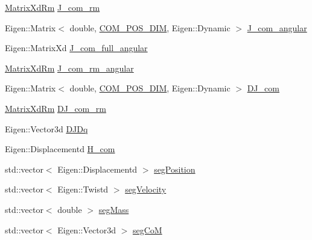 \begin{DoxyCompactItemize}
\item 
\hyperlink{namespaceocra__icub_aa5e36a19ed031c28ca83c207bd7dd83f}{Matrix\+Xd\+Rm} \hyperlink{structOcraWbiModel_1_1OcraWbiModel__pimpl_a58b26a33ee0449f71a3d338c23ea29d5}{J\+\_\+com\+\_\+rm}
\item 
Eigen\+::\+Matrix$<$ double, \hyperlink{OcraWbiModel_8cpp_a72cb22de2538ae949cc73fa3d7c33bdc}{C\+O\+M\+\_\+\+P\+O\+S\+\_\+\+D\+IM}, Eigen\+::\+Dynamic $>$ \hyperlink{structOcraWbiModel_1_1OcraWbiModel__pimpl_a1755993b2e425c6a49c55874c6c455e4}{J\+\_\+com\+\_\+angular}
\item 
Eigen\+::\+Matrix\+Xd \hyperlink{structOcraWbiModel_1_1OcraWbiModel__pimpl_ac064807ab1c8a89585cb7aa5f49d8744}{J\+\_\+com\+\_\+full\+\_\+angular}
\item 
\hyperlink{namespaceocra__icub_aa5e36a19ed031c28ca83c207bd7dd83f}{Matrix\+Xd\+Rm} \hyperlink{structOcraWbiModel_1_1OcraWbiModel__pimpl_ad52987f0908ab1b44779e3d752a7b97b}{J\+\_\+com\+\_\+rm\+\_\+angular}
\item 
Eigen\+::\+Matrix$<$ double, \hyperlink{OcraWbiModel_8cpp_a72cb22de2538ae949cc73fa3d7c33bdc}{C\+O\+M\+\_\+\+P\+O\+S\+\_\+\+D\+IM}, Eigen\+::\+Dynamic $>$ \hyperlink{structOcraWbiModel_1_1OcraWbiModel__pimpl_a38a8628ca93524e08beada55f455249b}{D\+J\+\_\+com}
\item 
\hyperlink{namespaceocra__icub_aa5e36a19ed031c28ca83c207bd7dd83f}{Matrix\+Xd\+Rm} \hyperlink{structOcraWbiModel_1_1OcraWbiModel__pimpl_a864b4ce170b3526fba0f7e832bfbb2d8}{D\+J\+\_\+com\+\_\+rm}
\item 
Eigen\+::\+Vector3d \hyperlink{structOcraWbiModel_1_1OcraWbiModel__pimpl_accd197872291c3e90272b8ebd87cefc8}{D\+J\+Dq}
\item 
Eigen\+::\+Displacementd \hyperlink{structOcraWbiModel_1_1OcraWbiModel__pimpl_a5e031088136b048a403c9df06e62c2b8}{H\+\_\+com}
\item 
std\+::vector$<$ Eigen\+::\+Displacementd $>$ \hyperlink{structOcraWbiModel_1_1OcraWbiModel__pimpl_a47b0a577b990fa7db3bc04a7a8107c31}{seg\+Position}
\item 
std\+::vector$<$ Eigen\+::\+Twistd $>$ \hyperlink{structOcraWbiModel_1_1OcraWbiModel__pimpl_a6e95ae9d994aa67c9a2fc4021f80bb54}{seg\+Velocity}
\item 
std\+::vector$<$ double $>$ \hyperlink{structOcraWbiModel_1_1OcraWbiModel__pimpl_a6cdb912e87fd9cea517e098615c8f945}{seg\+Mass}
\item 
std\+::vector$<$ Eigen\+::\+Vector3d $>$ \hyperlink{structOcraWbiModel_1_1OcraWbiModel__pimpl_af244a33c7309714ca793d29247ead8b8}{seg\+CoM}

\end{DoxyCompactItemize}
